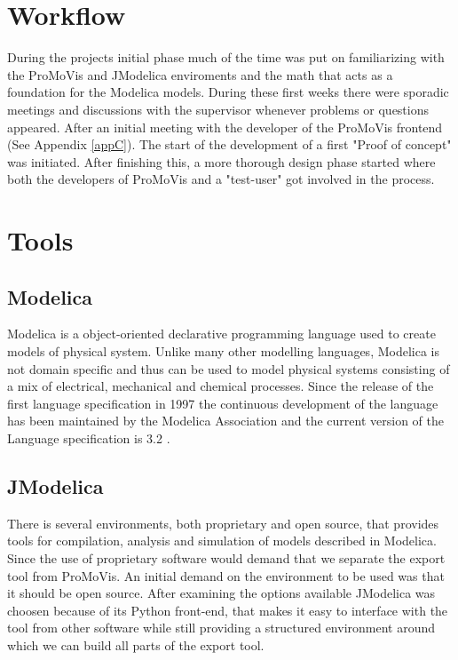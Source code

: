 \section{Workflow}
During the projects initial phase much of the time was put on familiarizing with the ProMoVis and JModelica enviroments and the math that acts as a foundation for the Modelica models. During these first weeks there were sporadic meetings and discussions with the supervisor whenever problems or questions appeared. After an initial meeting with the developer of the ProMoVis frontend (See Appendix \ref{appC}). The start of the development of a first "Proof of concept" was initiated. After finishing this, a more thorough design phase started where both the developers of ProMoVis and a "test-user" got involved in the process. 
\section{Tools}
\subsection{Modelica}
Modelica is a object-oriented declarative programming language used to create models of physical system. Unlike many other modelling languages, Modelica is not domain specific and thus can be used to model physical systems consisting of a mix of electrical, mechanical and chemical processes. Since the release of the first language specification in 1997 the continuous development of the language has been maintained by the Modelica Association and the current version of the Language specification is 3.2 \cite{ModelicaSpec}.\nocite{*}
\subsection{JModelica}
There is several environments, both proprietary and open source, that provides tools for compilation, analysis and simulation of  models described in Modelica. Since the use of proprietary software would demand that we separate the export tool from ProMoVis. An initial demand on the environment to be used was that it should be open source. After examining the options available JModelica\cite{jmodelicaorg}\nocite{*} was choosen because of its Python front-end, that makes it easy to interface with the tool from other software while still providing a structured environment around which we can build all parts of the export tool.   
